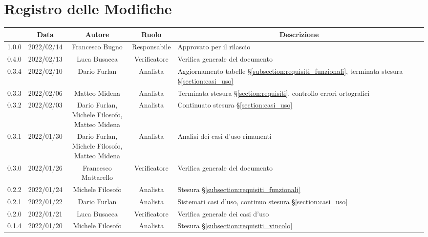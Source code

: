\thispagestyle{empty}
\section*{Registro delle Modifiche}

\begin{center}
	\renewcommand{\arraystretch}{1.8}
	\begin{longtable}[c]{c | c | c | c | p{5cm}}
		\rowcolor[HTML]{125E28}
		\multicolumn{1}{c}{\color[HTML]{FFFFFF} \textbf{Versione}} & 
		\multicolumn{1}{c}{\color[HTML]{FFFFFF} \textbf{Data}} & 
		\multicolumn{1}{c}{\color[HTML]{FFFFFF} \textbf{Autore}} & 
		\multicolumn{1}{c}{\color[HTML]{FFFFFF} \textbf{Ruolo}} & 
		\multicolumn{1}{c}{\color[HTML]{FFFFFF} \textbf{Descrizione}} \\
		\endhead
		1.0.0 & 2022/02/14 & Francesco Bugno & Responsabile & Approvato per il rilascio\\
		0.4.0 & 2022/02/13 & Luca Busacca & Verificatore & Verifica generale del documento \\
		0.3.4 & 2022/02/10 & Dario Furlan & Analista & Aggiornamento tabelle §\ref{subsection:requisiti_funzionali}, terminata stesura §\ref{section:casi_uso}\\
		0.3.3 & 2022/02/06 & Matteo Midena & Analista & Terminata stesura §\ref{section:requisiti}, controllo errori ortografici\\
		0.3.2 & 2022/02/03 & \shortstack{Dario Furlan,\\ Michele Filosofo,\\ Matteo Midena} & Analista & Continuato stesura §\ref{section:casi_uso} \\
		0.3.1 & 2022/01/30 & \shortstack{Dario Furlan,\\ Michele Filosofo,\\ Matteo Midena} & Analista & Analisi dei casi d'uso rimanenti \\
		0.3.0 & 2022/01/26 & Francesco Mattarello & Verificatore & Verifica generale del documento\\
		0.2.2 & 2022/01/24 & Michele Filosofo & Analista & Stesura §\ref{subsection:requisiti_funzionali} \\
		0.2.1 & 2022/01/22 & Dario Furlan & Analista & Sistemati casi d'uso, continuo stesura §\ref{section:casi_uso}\\
		0.2.0 & 2022/01/21 & Luca Busacca & Verificatore & Verifica generale dei casi d'uso \\
		0.1.4 & 2022/01/20 & Michele Filosofo & Analista & Stesura §\ref{subsection:requisiti_vincolo} \\

\end{longtable}
\end{center}
